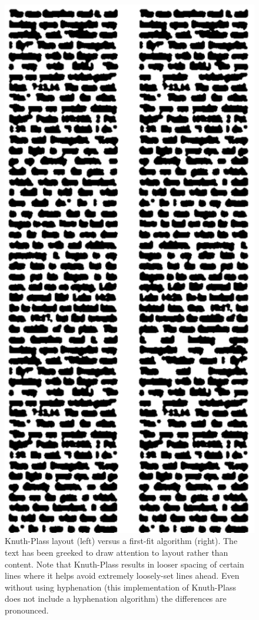 \begin{figure}
\begin{center}
\includegraphics[height=0.8\textheight]{gfx/greek}
\end{center}
\caption[Knuth-Plass layout versus a first-fit algorithm]{Knuth-Plass layout (left) versus a first-fit algorithm (right). The text has been greeked to draw attention to layout rather than content. Note that Knuth-Plass results in looser spacing of certain lines where it helps avoid extremely loosely-set lines ahead. Even without using hyphenation (this implementation of Knuth-Plass does not include a hyphenation algorithm) the differences are pronounced. }
\label{fig:greek}
\end{figure}


